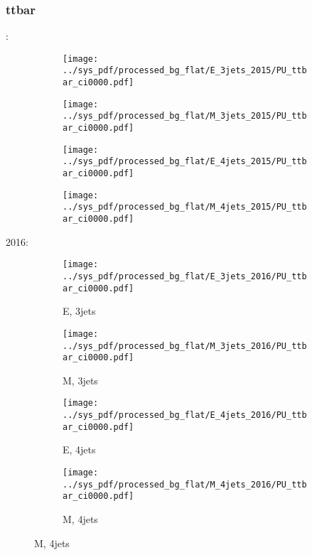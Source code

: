 \documentclass{beamer}
\begin{document}
\begin{frame}
\frametitle{ttbar}
\fontsize{5}{1}:
\begin{figure}
\centering
\begin{subfigure}[b]{0.24\textwidth}
\texttt{[image: ../sys\_pdf/processed\_bg\_flat/E\_3jets\_2015/PU\_ttbar\_ci0000.pdf]}
\end{subfigure}
\begin{subfigure}[b]{0.24\textwidth}
\texttt{[image: ../sys\_pdf/processed\_bg\_flat/M\_3jets\_2015/PU\_ttbar\_ci0000.pdf]}
\end{subfigure}
\begin{subfigure}[b]{0.24\textwidth}
\texttt{[image: ../sys\_pdf/processed\_bg\_flat/E\_4jets\_2015/PU\_ttbar\_ci0000.pdf]}
\end{subfigure}
\begin{subfigure}[b]{0.24\textwidth}
\texttt{[image: ../sys\_pdf/processed\_bg\_flat/M\_4jets\_2015/PU\_ttbar\_ci0000.pdf]}
\end{subfigure}
\end{figure}
2016:
\begin{figure}
\centering
\begin{subfigure}[b]{0.24\textwidth}
\texttt{[image: ../sys\_pdf/processed\_bg\_flat/E\_3jets\_2016/PU\_ttbar\_ci0000.pdf]}
\captionsetup{font=tiny}
\caption{E, 3jets}
\end{subfigure}
\begin{subfigure}[b]{0.24\textwidth}
\texttt{[image: ../sys\_pdf/processed\_bg\_flat/M\_3jets\_2016/PU\_ttbar\_ci0000.pdf]}
\captionsetup{font=tiny}
\caption{M, 3jets}
\end{subfigure}
\begin{subfigure}[b]{0.24\textwidth}
\texttt{[image: ../sys\_pdf/processed\_bg\_flat/E\_4jets\_2016/PU\_ttbar\_ci0000.pdf]}
\captionsetup{font=tiny}
\caption{E, 4jets}
\end{subfigure}
\begin{subfigure}[b]{0.24\textwidth}
\texttt{[image: ../sys\_pdf/processed\_bg\_flat/M\_4jets\_2016/PU\_ttbar\_ci0000.pdf]}
\captionsetup{font=tiny}
\caption{M, 4jets}
\end{subfigure}
\end{figure}
\end{frame}
\end{document}
